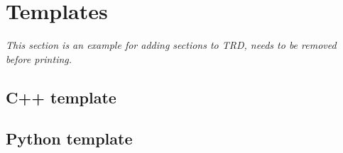 \documentclass[12pt]{article}
\begin{document}
\section{Templates}
\emph{This section is an example for adding sections to TRD, needs to be removed before printing.}

\subsection{C++ template}


\subsection{Python template}

\end{document}
